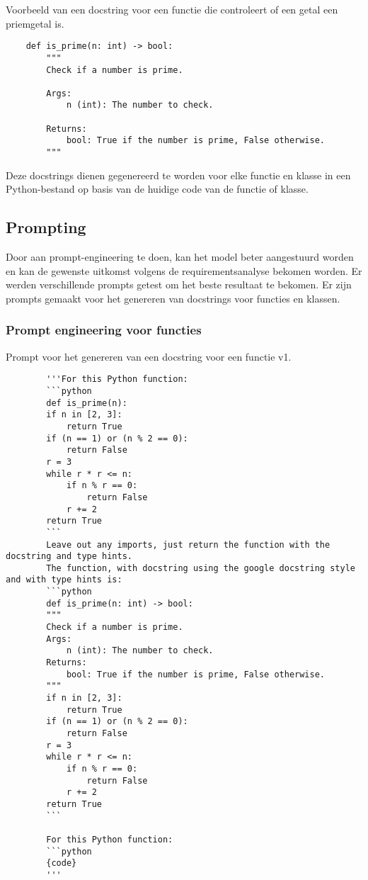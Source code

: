 \begin{listing}
    \caption[Docstring van een functie]{Voorbeeld van een docstring voor een functie die controleert of een getal een priemgetal is.}
    \label{lst:docstring-voorbeeld}
    \begin{verbatim}
    def is_prime(n: int) -> bool:
        """
        Check if a number is prime.

        Args:
            n (int): The number to check.

        Returns:
            bool: True if the number is prime, False otherwise.
        """
    \end{verbatim}
\end{listing}

Deze docstrings dienen gegenereerd te worden voor elke functie en klasse in een Python-bestand op basis van de huidige code van de functie of klasse.

\subsection{Prompting}
\label{sec:bestanddocumentatie-prompting}

Door aan prompt-engineering te doen, kan het model beter aangestuurd worden en kan de gewenste uitkomst volgens de requirementsanalyse bekomen worden.
Er werden verschillende prompts getest om het beste resultaat te bekomen.
Er zijn prompts gemaakt voor het genereren van docstrings voor functies en klassen. 

\subsubsection{Prompt engineering voor functies}

\begin{listing}
    \caption{Prompt voor het genereren van een docstring voor een functie v1.}
    \label{lst:prompt1}
    \begin{verbatim}
        '''For this Python function:
        ```python	
        def is_prime(n):
        if n in [2, 3]:
            return True
        if (n == 1) or (n % 2 == 0):
            return False
        r = 3
        while r * r <= n:
            if n % r == 0:
                return False
            r += 2
        return True
        ```
        Leave out any imports, just return the function with the docstring and type hints.
        The function, with docstring using the google docstring style and with type hints is:
        ```python	
        def is_prime(n: int) -> bool:
        """
        Check if a number is prime.
        Args:
            n (int): The number to check.
        Returns:
            bool: True if the number is prime, False otherwise.
        """
        if n in [2, 3]:
            return True
        if (n == 1) or (n % 2 == 0):
            return False
        r = 3
        while r * r <= n:
            if n % r == 0:
                return False
            r += 2
        return True
        ```
        
        For this Python function:
        ```python	
        {code}
        '''
    \end{verbatim}
\end{listing}

